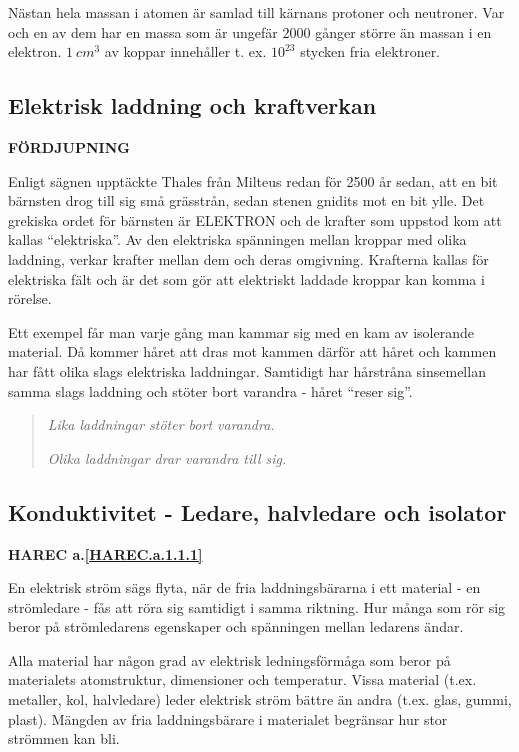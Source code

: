Nästan hela massan i atomen är samlad till kärnans protoner och neutroner. Var
och en av dem har en massa som är ungefär 2000 gånger större än massan i en
elektron. \(1\ cm^3\) av koppar innehåller t. ex. \(10^{23}\) stycken fria
elektroner.

\subsection{Elektrisk laddning och kraftverkan}
\textbf{FÖRDJUPNING}

Enligt sägnen upptäckte Thales från Milteus redan för 2500 år sedan, att en bit
bärnsten drog till sig små grässtrån, sedan stenen gnidits mot en bit ylle. Det
grekiska ordet för bärnsten är ELEKTRON och de krafter som uppstod kom att
kallas ``elektriska''. Av den elektriska spänningen mellan kroppar med olika
laddning, verkar krafter mellan dem och deras omgivning. Krafterna kallas för
elektriska fält och är det som gör att elektriskt laddade kroppar kan komma i
rörelse.

Ett exempel får man varje gång man kammar sig med en kam av isolerande
material. Då kommer håret att dras mot kammen därför att håret och kammen har
fått olika slags elektriska laddningar. Samtidigt har hårstråna sinsemellan
samma slags laddning och stöter bort varandra - håret ``reser sig''.

\begin{quote}
\emph{Lika laddningar stöter bort varandra.}

\emph{Olika laddningar drar varandra till sig.}
\end{quote}

\subsection{Konduktivitet - Ledare, halvledare och isolator}
\textbf{HAREC a.\ref{HAREC.a.1.1.1}\label{myHAREC.a.1.1.1}}

En elektrisk ström sägs flyta, när de fria laddningsbärarna i ett material - en
strömledare - fås att röra sig samtidigt i samma riktning. Hur många som rör
sig beror på strömledarens egenskaper och spänningen mellan ledarens ändar.

Alla material har någon grad av elektrisk ledningsförmåga som beror på
materialets atomstruktur, dimensioner och temperatur. Vissa material (t.ex.
metaller, kol, halvledare) leder elektrisk ström bättre än andra (t.ex. glas,
gummi, plast). Mängden av fria laddningsbärare i materialet begränsar hur
stor strömmen kan bli.

